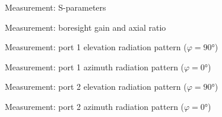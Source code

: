 \documentclass[11pt,a4paper,twoside,openany]{report}
\begin{document}
\newpage
\begin{figure}[!ht]
    \centering
    
    \caption{\label{fig:measurement-sparameters}Measurement: S-parameters}
\end{figure}

\begin{figure}[!ht]
    \centering
    
    \caption{\label{fig:measurement-boresight-radiation}Measurement: boresight gain and axial ratio}
\end{figure}

\begin{figure}[!ht]
    \centering
    
    \caption{\label{fig:measurement-elevation-pattern-port1}Measurement: port 1 elevation radiation pattern ($\varphi=\ang{90}$)}
\end{figure}

\begin{figure}[!ht]
    \centering
    
    \caption{\label{fig:measurement-azimuth-pattern-port1}Measurement: port 1 azimuth radiation pattern ($\varphi=\ang{0}$)}
\end{figure}

\begin{figure}[!ht]
    \centering
    
    \caption{\label{fig:measurement-elevation-pattern-port2}Measurement: port 2 elevation radiation pattern ($\varphi=\ang{90}$)}
\end{figure}

\begin{figure}[!ht]
    \centering
    
    \caption{\label{fig:measurement-azimuth-pattern-port2}Measurement: port 2 azimuth radiation pattern ($\varphi=\ang{0}$)}
\end{figure}


\printbibliography[heading=bibintoc]

\end{document}
